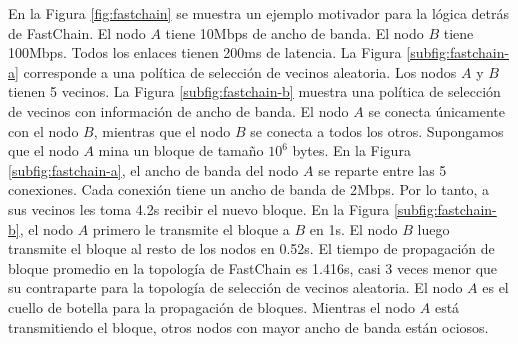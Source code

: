 


%
En la Figura \ref{fig:fastchain} se muestra un ejemplo motivador para la lógica detrás de FastChain.
%
El nodo $A$ tiene 10Mbps de ancho de banda.
%
El nodo $B$ tiene 100Mbps.
%
Todos los enlaces tienen 200ms de latencia.
%
La Figura \ref{subfig:fastchain-a} corresponde a una política de selección de vecinos aleatoria.
%
Los nodos $A$ y $B$ tienen 5 vecinos.
%
La Figura \ref{subfig:fastchain-b} muestra una política de selección de vecinos
con información de ancho de banda.
%
El nodo $A$ se conecta únicamente con el nodo $B$, mientras que el nodo $B$ se conecta
a todos los otros.
%
Supongamos que el nodo $A$ mina un bloque de tamaño $10^6$ bytes.
%
En la Figura \ref{subfig:fastchain-a}, el ancho de banda del nodo $A$ se reparte entre las 5 conexiones.
%
Cada conexión tiene un ancho de banda de 2Mbps.
%
Por lo tanto, a sus vecinos les toma 4.2s recibir el nuevo bloque.
%
En la Figura \ref{subfig:fastchain-b}, el nodo $A$ primero le transmite el bloque a $B$ en 1s.
%
El nodo $B$ luego transmite el bloque al resto de los nodos en 0.52s.
%
El tiempo de propagación de bloque promedio en la topología de FastChain es 1.416s,
casi 3 veces menor que su contraparte para la topología de selección de vecinos aleatoria.
%
El nodo $A$ es el cuello de botella para la propagación de bloques.
%
Mientras el nodo $A$ está transmitiendo el bloque, otros nodos con mayor ancho de banda
están ociosos.
%

